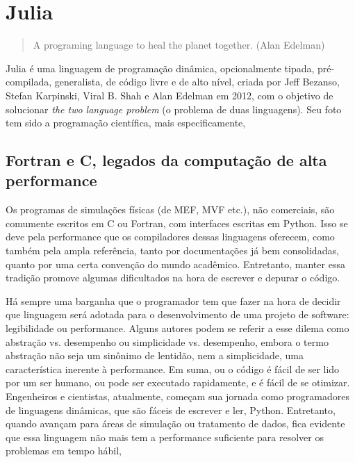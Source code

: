 \chapter{Julia} 
\label{ch:julia}

\begin{quotation}
    A programing language to heal the planet together.
    (Alan Edelman)
\end{quotation}

Julia é uma linguagem de programação dinâmica, opcionalmente tipada, pré-compilada, generalista, de código livre\footnotemark{} e de alto nível, criada por Jeff Bezanso, Stefan Karpinski, Viral B. Shah e Alan Edelman em 2012, com o objetivo de solucionar \emph{the two language problem} (o problema de duas linguagens). Seu foto tem sido a programação científica, mais especificamente,  \cite[Capítulo: The scope of Julia]{Sherrington}



\section{Fortran e C, legados da computação de alta performance}

Os programas de simulações físicas (de MEF, MVF etc.), não comerciais, são comumente escritos em C ou Fortran, com interfaces escritas em Python. Isso se deve pela performance que os compiladores dessas linguagens oferecem, como também pela ampla referência, tanto por documentações já bem consolidadas, quanto por uma certa convenção do mundo acadêmico. Entretanto, manter essa tradição promove algumas dificultados na hora de escrever e depurar o código.


Há sempre uma barganha que o programador tem que fazer na hora de decidir que linguagem será adotada para o desenvolvimento de uma projeto de software: legibilidade ou performance. Alguns autores podem se referir a esse dilema como abstração vs. desempenho ou simplicidade vs. desempenho, embora o termo abstração não seja um sinônimo de lentidão, nem a simplicidade, uma característica inerente à performance. Em suma, ou o código é fácil de ser lido por um ser humano, ou pode ser executado rapidamente, e é fácil de se otimizar. Engenheiros e cientistas, atualmente, começam sua jornada como programadores de linguagens dinâmicas, que são fáceis de escrever e ler, Python. Entretanto, quando avançam para áreas de simulação ou tratamento de dados, fica evidente que essa linguagem não mais tem a performance suficiente para resolver os problemas em tempo hábil,


